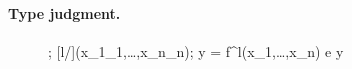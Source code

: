 \documentclass[runningheads]{llncs}
\begin{document}
\paragraph{Type judgment.}

\begin{figure}[t]

\infrule[T-Call]
{}
{\funenv; [l\beta/\alpha](x_1\COL\typ_1,\dots,x_n\COL\typ_n); \beta \p \LET y = f^l(x_1,\dots,x_n) \IN e \COL \typ \produces \tenv\diff y}

\label{Typing rules.}
\label{fig:typingRules}
\end{figure}



\end{document}
